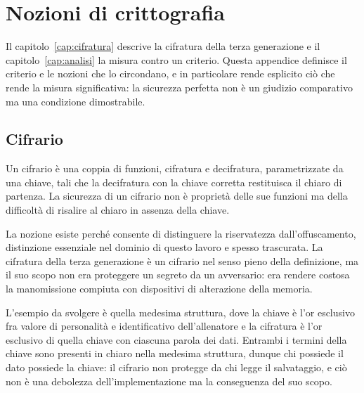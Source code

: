 
\chapter{Nozioni di crittografia}
\label{app:crittografia}

Il capitolo~\ref{cap:cifratura} descrive la cifratura della terza generazione e il capitolo~\ref{cap:analisi} la misura contro un criterio. Questa appendice definisce il criterio e le nozioni che lo circondano, e in particolare rende esplicito ciò che rende la misura significativa: la sicurezza perfetta non è un giudizio comparativo ma una condizione dimostrabile.

\section{Cifrario}

Un cifrario è una coppia di funzioni, cifratura e decifratura, parametrizzate da una chiave, tali che la decifratura con la chiave corretta restituisca il chiaro di partenza. La sicurezza di un cifrario non è proprietà delle sue funzioni ma della difficoltà di risalire al chiaro in assenza della chiave.

La nozione esiste perché consente di distinguere la riservatezza dall'offuscamento, distinzione essenziale nel dominio di questo lavoro e spesso trascurata. La cifratura della terza generazione è un cifrario nel senso pieno della definizione, ma il suo scopo non era proteggere un segreto da un avversario: era rendere costosa la manomissione compiuta con dispositivi di alterazione della memoria.

L'esempio da svolgere è quella medesima struttura, dove la chiave è l'or esclusivo fra valore di personalità e identificativo dell'allenatore e la cifratura è l'or esclusivo di quella chiave con ciascuna parola dei dati. Entrambi i termini della chiave sono presenti in chiaro nella medesima struttura, dunque chi possiede il dato possiede la chiave: il cifrario non protegge da chi legge il salvataggio, e ciò non è una debolezza dell'implementazione ma la conseguenza del suo scopo.

